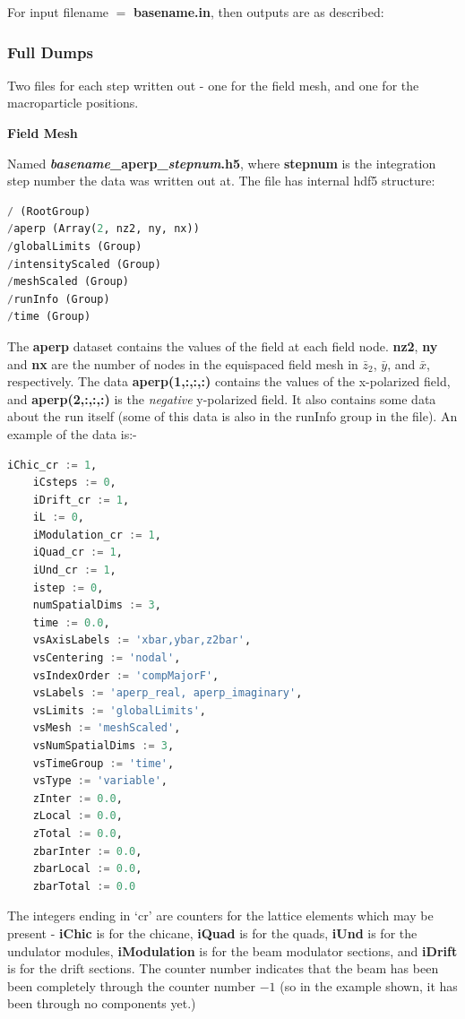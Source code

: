 \documentclass[12pt]{article}%
\begin{document}
For input filename $=$ {\bf basename.in}, then outputs are as described:

\subsubsection{Full Dumps}

Two files for each step written out - one for the field mesh, and one for the macroparticle positions.

{\bf Field Mesh}

Named {\bf \textit{basename}\_aperp\_\textit{stepnum}.h5}, where {\bf stepnum} is the integration step number the data was written out at. The file has internal hdf5 structure:

\begin{lstlisting}[language=python]
/ (RootGroup) 
/aperp (Array(2, nz2, ny, nx)) 
/globalLimits (Group) 
/intensityScaled (Group) 
/meshScaled (Group) 
/runInfo (Group) 
/time (Group) 
\end{lstlisting}

The {\bf aperp} dataset contains the values of the field at each field node. {\bf nz2}, {\bf ny} and {\bf nx} are the number of nodes in the equispaced field mesh in $\bar{z}_2$, $\bar{y}$, and $\bar{x}$, respectively. The data {\bf aperp(1,:,:,:)} contains the values of the x-polarized field, and {\bf aperp(2,:,:,:)} is the \textit{negative} y-polarized field.  It also contains some data about the run itself (some of this data is also in the runInfo group in the file). An example of the data is:-

\begin{lstlisting}[language=python]
    iChic_cr := 1,
    iCsteps := 0,
    iDrift_cr := 1,
    iL := 0,
    iModulation_cr := 1,
    iQuad_cr := 1,
    iUnd_cr := 1,
    istep := 0,
    numSpatialDims := 3,
    time := 0.0,
    vsAxisLabels := 'xbar,ybar,z2bar',
    vsCentering := 'nodal',
    vsIndexOrder := 'compMajorF',
    vsLabels := 'aperp_real, aperp_imaginary',
    vsLimits := 'globalLimits',
    vsMesh := 'meshScaled',
    vsNumSpatialDims := 3,
    vsTimeGroup := 'time',
    vsType := 'variable',
    zInter := 0.0,
    zLocal := 0.0,
    zTotal := 0.0,
    zbarInter := 0.0,
    zbarLocal := 0.0,
    zbarTotal := 0.0
\end{lstlisting}

The integers ending in `cr' are counters for the lattice elements which may be present - {\bf iChic} is for the chicane, {\bf iQuad} is for the quads, {\bf iUnd} is for the undulator modules, {\bf iModulation} is for the beam modulator sections, and {\bf iDrift} is for the drift sections. The counter number indicates that the beam has been been completely through the counter number $-1$ (so in the example shown, it has been through no components yet.)
\end{document}
